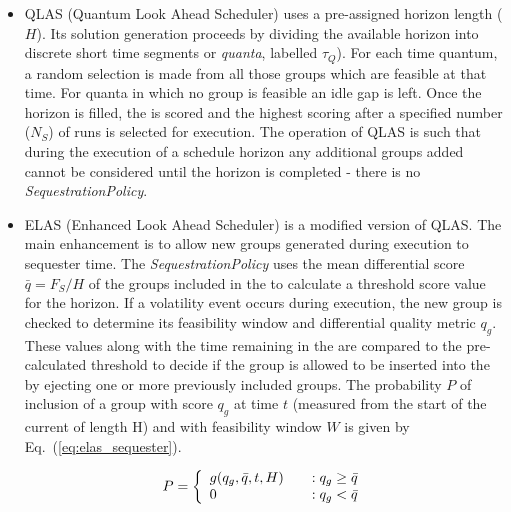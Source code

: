 \begin{itemize}
\item QLAS (Quantum Look Ahead Scheduler)  uses a pre-assigned horizon length ($H$). Its solution generation proceeds by dividing the available horizon into discrete short time segments or \emph{quanta}, labelled $\tau_Q$). For each time quantum, a random selection is made from all those groups which are feasible at that time. For quanta in which no group is feasible an idle gap is left. Once the horizon is filled, the \echelon is scored and the highest scoring \echelon after a specified number ($N_S$) of runs is selected for execution. The operation of QLAS is such that during the execution of a schedule horizon any additional groups added cannot be considered until the horizon is completed - there is no \emph{SequestrationPolicy}. 

\item ELAS (Enhanced Look Ahead Scheduler)  is a modified version of QLAS. The main enhancement is to allow new groups generated during execution to sequester time. The \emph{SequestrationPolicy} uses the mean differential score $\bar{q} = F_S/H$ of the groups included in the \echelon to calculate a threshold score value for the horizon. If a volatility event occurs during execution, the new group is checked to determine its feasibility window and differential quality metric $q_g$. These values along with the time remaining in the \echelon are compared to the pre-calculated threshold to decide if the group is allowed to be inserted into the \echelon by ejecting one or more previously included groups. The probability $P$ of inclusion of a group with score $q_g$ at time $t$ (measured from the start of the current \echelon of length H) and with feasibility window $W$ is given by Eq.~(\ref{eq:elas_sequester}).

\begin{equation}
\label{eq:elas_sequester}
  P = \left\{
    \begin{array}{l l}
     g(q_g,\bar{q},t,H) & \quad : q_g \geq \bar{q}\\
     0                  & \quad : q_g < \bar{q}\\
    \end{array} \right.
\end{equation}


\end{itemize}
